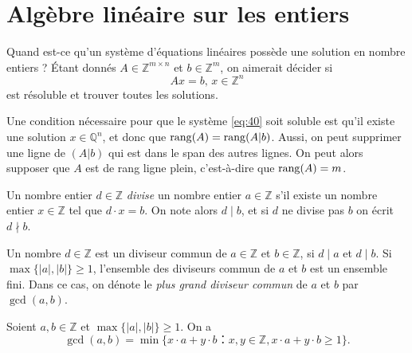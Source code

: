 \chapter{Algèbre linéaire sur les entiers}
\label{cha:algebre-lineaire-sur}
 

Quand est-ce qu'un système d'équations linéaires possède une solution en nombre entiers ? Étant donnés $A ∈ℤ^{m × n}$ et $b ∈ℤ^m$, on aimerait décider si 
\begin{equation}
  \label{eq:40}
  A x = b, \, x ∈ ℤ^n 
\end{equation}
est résoluble et trouver toutes les solutions.



Une condition nécessaire pour que le système \eqref{eq:40} soit soluble est qu'il existe une solution $x ∈ℚ^n$, et donc que $\operatorname{rang}(A) = \operatorname{rang}(A|b)$. Aussi, on peut supprimer une ligne de $(A|b)$ qui est dans le span des autres lignes. On peut alors supposer que $A$ est de rang ligne plein, c'est-à-dire que $\operatorname{rang}(A) = m$. 

\begin{definition}
  \label{def:44}
  Un nombre entier $d ∈ℤ$ \emph{divise} un nombre entier $a ∈ℤ$ s'il existe un nombre entier $x ∈ℤ$ tel que $d⋅x =b$. On note alors $d\mid b$, et si $d$ ne divise pas $b$ on écrit $d \nmid b$. 
\end{definition}
\begin{definition}
  \label{def:45}
  Un nombre $d ∈ℤ$ est un diviseur commun de $a∈ℤ$ et $b ∈ℤ$, si $d \mid a$ et $d \mid b$. Si $\max\{|a|,|b|\} ≥1$, l'ensemble des diviseurs commun de $a$ et $b$ est un ensemble fini. Dans ce cas, on dénote le \emph{plus grand diviseur commun} de $a$ et $b$ par $\gcd(a,b)$. 
\end{definition}


\begin{theorem}
  \label{thr:48}
  Soient $a,b ∈ℤ$ et $\max\{|a|,|b|\} ≥1$. On a
  \begin{displaymath}
    \gcd(a,b) = \min \{ x ⋅a + y ⋅ b： x,y ∈ℤ,  x ⋅a + y ⋅ b≥1\}.
  \end{displaymath}
\end{theorem}

